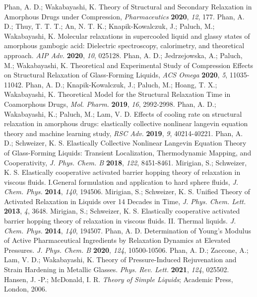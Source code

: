 \documentclass[twocolumn,preprintnumbers,amsmath,amssymb,superscriptaddress]{revtex4}
\begin{document}
\begin{thebibliography}{5}
 Phan, A. D.; Wakabayashi, K. Theory of Structural and Secondary Relaxation in Amorphous Drugs under Compression, \emph{Pharmaceutics} {\bf 2020}, \emph{12}, 177.
 Phan, A. D.; Thuy, T. T. T.; An, N. T. K.; Knapik-Kowalczuk, J.; Paluch, M.; Wakabayashi, K.  Molecular relaxations in supercooled liquid and glassy states of amorphous gambogic acid: Dielectric spectroscopy, calorimetry, and theoretical approach. \emph{AIP Adv.} {\bf 2020}, \emph{10}, 025128.
 Phan, A. D.; Jedrzejowska, A.; Paluch, M.; Wakabayashi, K. Theoretical and Experimental Study of Compression Effects on Structural Relaxation of Glass-Forming Liquids, \emph{ACS Omega} {\bf2020}, \emph{5}, 11035-11042.
 Phan, A. D.; Knapik-Kowalczuk, J.; Paluch, M.; Hoang, T. X.; Wakabayashi, K. Theoretical Model for the Structural Relaxation Time in Coamorphous Drugs, \emph{Mol. Pharm.} {\bf 2019}, \emph{16}, 2992-2998.
 Phan, A. D.; Wakabayashi, K.; Paluch, M.;  Lam, V. D. Effects of cooling rate on structural relaxation in amorphous drugs: elastically collective nonlinear langevin equation theory and machine learning study, \emph{RSC Adv.} {\bf 2019}, \emph{9}, 40214-40221.
 Phan, A. D.; Schweizer, K. S. Elastically Collective Nonlinear Langevin Equation Theory of Glass-Forming Liquids: Transient Localization, Thermodynamic Mapping, and Cooperativity, \emph{J. Phys. Chem. B} {\bf 2018}, \emph{122}, 8451-8461.
 Mirigian, S.; Schweizer, K. S. Elastically cooperative activated barrier hopping theory of relaxation in viscous fluids. I.General formulation and application to hard sphere fluids, \emph{J. Chem. Phys.} {\bf 2014}, \emph{140}, 194506.
 Mirigian, S.; Schweizer, K. S. Unified Theory of Activated Relaxation in Liquids over 14 Decades in Time, \emph{J. Phys. Chem. Lett.} {\bf 2013}, \emph{4}, 3648.
 Mirigian, S.; Schweizer, K. S. Elastically cooperative activated barrier hopping theory of relaxation in viscous fluids. II. Thermal liquids. \emph{J. Chem. Phys.} {\bf 2014}, \emph{140}, 194507.
 Phan, A. D. Determination of Young’s Modulus of Active Pharmaceutical Ingredients by Relaxation Dynamics at Elevated Pressures. \emph{J. Phys. Chem. B} {\bf 2020}, \emph{124}, 10500-10506.
 Phan, A. D.; Zaccone, A.; Lam, V. D.; Wakabayashi, K. Theory of Pressure-Induced Rejuvenation and Strain Hardening in Metallic Glasses. \emph{Phys. Rev. Lett.} {\bf 2021}, \emph{124}, 025502.
 Hansen, J. -P.; McDonald, I. R. \emph{Theory of Simple Liquids}; Academic Press, London, 2006.

\end{thebibliography}
\end{document}
